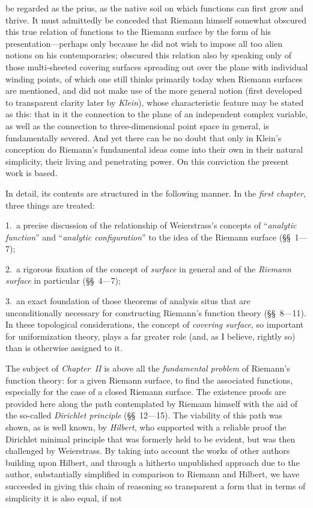 \documentclass{article}
\begin{document}
be regarded as the prius, as the native soil on which functions can first grow and thrive. It must admittedly be conceded that Riemann himself somewhat obscured this true relation of functions to the Riemann surface by the form of his presentation---perhaps only because he did not wish to impose all too alien notions on his contemporaries; obscured this relation also by speaking only of those multi-sheeted covering surfaces spreading out over the plane with individual winding points, of which one still thinks primarily today when Riemann surfaces are mentioned, and did not make use of the more general notion (first developed to transparent clarity later by \emph{Klein}), whose characteristic feature may be stated as this: that in it the connection to the plane of an independent complex variable, as well as the connection to three-dimensional point space in general, is fundamentally severed. And yet there can be no doubt that only in Klein's conception do Riemann's fundamental ideas come into their own in their natural simplicity, their living and penetrating power. On this conviction the present work is based.

In detail, its contents are structured in the following manner. In the \emph{first chapter}, three things are treated:

1.\ a precise discussion of the relationship of Weierstrass's concepts of ``\emph{analytic function}'' and ``\emph{analytic configuration}'' to the idea of the Riemann surface (§§~1---7);

2.\ a rigorous fixation of the concept of \emph{surface} in general and of the \emph{Riemann surface} in particular (§§~4---7);

3.\ an exact foundation of those theorems of analysis situs that are unconditionally necessary for constructing Riemann's function theory (§§~8---11). In these topological considerations, the concept of \emph{covering surface}, so important for uniformization theory, plays a far greater role (and, as I believe, rightly so) than is otherwise assigned to it.

The subject of \emph{Chapter~II} is above all the \emph{fundamental problem} of Riemann's function theory: for a given Riemann surface, to find the associated functions, especially for the case of a closed Riemann surface. The existence proofs are provided here along the path contemplated by Riemann himself with the aid of the so-called \emph{Dirichlet principle} (§§~12---15). The viability of this path was shown, as is well known, by \emph{Hilbert}, who supported with a reliable proof the Dirichlet minimal principle that was formerly held to be evident, but was then challenged by Weierstrass. By taking into account the works of other authors building upon Hilbert, and through a hitherto unpublished approach due to the author, substantially simplified in comparison to Riemann and Hilbert, we have succeeded in giving this chain of reasoning so transparent a form that in terms of simplicity it is also equal, if not
\end{document}

